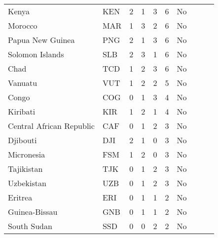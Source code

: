 \begin{longtable}{l l c c c c c c c c}
Kenya                      & KEN           & 2          & 1                   & 3         & 6                 & No              \\
Morocco                    & MAR           & 1          & 3                   & 2         & 6                 & No              \\
Papua New Guinea           & PNG           & 2          & 1                   & 3         & 6                 & No              \\
Solomon Islands            & SLB           & 2          & 3                   & 1         & 6                 & No              \\
Chad                       & TCD           & 1          & 2                   & 3         & 6                 & No              \\
Vanuatu                    & VUT           & 1          & 2                   & 2         & 5                 & No              \\
Congo                      & COG           & 0          & 1                   & 3         & 4                 & No              \\
Kiribati                   & KIR           & 1          & 2                   & 1         & 4                 & No              \\
Central African Republic   & CAF           & 0          & 1                   & 2         & 3                 & No              \\
Djibouti                   & DJI           & 2          & 1                   & 0         & 3                 & No              \\
Micronesia                 & FSM           & 1          & 2                   & 0         & 3                 & No              \\
Tajikistan                 & TJK           & 0          & 1                   & 2         & 3                 & No              \\
Uzbekistan                 & UZB           & 0          & 1                   & 2         & 3                 & No              \\
Eritrea                    & ERI           & 0          & 1                   & 1         & 2                 & No              \\
Guinea-Bissau              & GNB           & 0          & 1                   & 1         & 2                 & No              \\
South Sudan                & SSD           & 0          & 0                   & 2         & 2                 & No              \\

\end{longtable}

